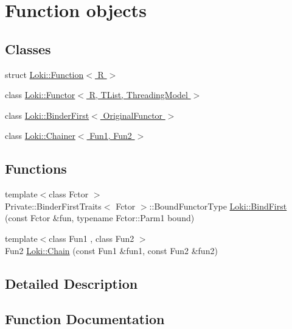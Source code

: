 \hypertarget{group__FunctorGroup}{}\section{Function objects}
\label{group__FunctorGroup}
\subsection*{Classes}
\begin{DoxyCompactItemize}
\item 
struct \hyperlink{structLoki_1_1Function}{Loki\+::\+Function$<$ R $>$}
\item 
class \hyperlink{classLoki_1_1Functor}{Loki\+::\+Functor$<$ R, T\+List, Threading\+Model $>$}
\item 
class \hyperlink{classLoki_1_1BinderFirst}{Loki\+::\+Binder\+First$<$ Original\+Functor $>$}
\item 
class \hyperlink{classLoki_1_1Chainer}{Loki\+::\+Chainer$<$ Fun1, Fun2 $>$}
\end{DoxyCompactItemize}
\subsection*{Functions}
\begin{DoxyCompactItemize}
\item 
{\footnotesize template$<$class Fctor $>$ }\\Private\+::\+Binder\+First\+Traits$<$ Fctor $>$\+::Bound\+Functor\+Type \hyperlink{group__FunctorGroup_ga94fba0f3868956b6abd10227a8b60f91}{Loki\+::\+Bind\+First} (const Fctor \&fun, typename Fctor\+::\+Parm1 bound)
\item 
{\footnotesize template$<$class Fun1 , class Fun2 $>$ }\\Fun2 \hyperlink{group__FunctorGroup_gac17424df361130d56a783346a0fea152}{Loki\+::\+Chain} (const Fun1 \&fun1, const Fun2 \&fun2)
\end{DoxyCompactItemize}


\subsection{Detailed Description}


\subsection{Function Documentation}
\hypertarget{group__FunctorGroup_ga94fba0f3868956b6abd10227a8b60f91}{}
